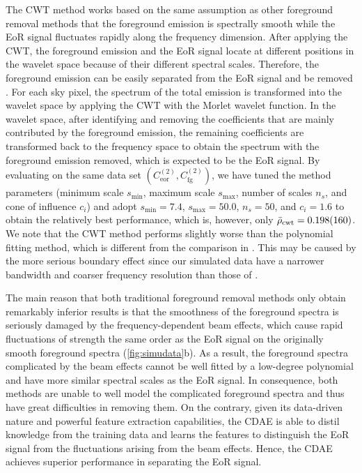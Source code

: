 \documentclass[fleqn,usenatbib]{mnras}
\newcommand{\R}[1]{\mathrm{#1}}
\begin{document}
The CWT method works based on the same assumption as other foreground
removal methods that the foreground emission is spectrally smooth while the
EoR signal fluctuates rapidly along the frequency dimension.
After applying the CWT, the foreground emission and the EoR signal locate
at different positions in the wavelet space because of their different
spectral scales.
Therefore, the foreground emission can be easily separated from the EoR
signal and be removed \citep{gu2013}.
For each sky pixel, the spectrum of the total emission is transformed into
the wavelet space by applying the CWT with the Morlet wavelet function.
In the wavelet space, after identifying and removing the coefficients that
are mainly contributed by the foreground emission, the remaining
coefficients are transformed back to the frequency space to obtain the
spectrum with the foreground emission removed, which is expected to be the
EoR signal.
By evaluating on the same data set
$\left( C_{\R{eor}}^{(2)}, C_{\R{fg}}^{(2)} \right)$,
we have tuned the method parameters (minimum scale $s_{\R{min}}$, maximum
scale $s_{\R{max}}$, number of scales $n_s$, and cone of influence $c_i$)
and adopt $s_{\R{min}} = 7.4$, $s_{\R{max}} = 50.0$, $n_s = 50$, and
$c_i = 1.6$ to obtain the relatively best performance, which is, however,
only $\bar{\rho}_{\R{cwt}} = \num{0.198 +- 0.160}$.
We note that the CWT method performs slightly worse than the polynomial
fitting method, which is different from the comparison in \citet{gu2013}.
This may be caused by the more serious boundary effect since our simulated
data have a narrower bandwidth and coarser frequency resolution than those
of \citet{gu2013}.

The main reason that both traditional foreground removal methods only
obtain remarkably inferior results is that the smoothness of the foreground
spectra is seriously damaged by the frequency-dependent beam effects, which
cause rapid fluctuations of strength the same order as the EoR signal on
the originally smooth foreground spectra (\autoref{fig:simudata}b).
As a result, the foreground spectra complicated by the beam effects cannot
be well fitted by a low-degree polynomial and have more similar spectral
scales as the EoR signal.
In consequence, both methods are unable to well model the complicated
foreground spectra and thus have great difficulties in removing them.
On the contrary, given its data-driven nature and powerful feature
extraction capabilities, the CDAE is able to distil knowledge from the
training data and learns the features to distinguish the EoR signal from
the fluctuations arising from the beam effects.
Hence, the CDAE achieves superior performance in separating the EoR signal.
\end{document}
